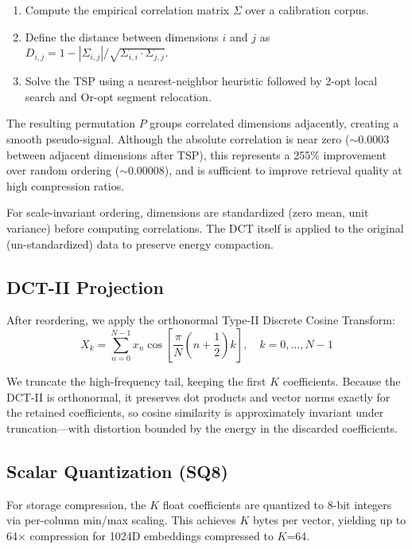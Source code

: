 \documentclass[sigconf]{acmart}
\begin{document}
\begin{enumerate}
    \item Compute the empirical correlation matrix $\Sigma$ over a calibration corpus.
    \item Define the distance between dimensions $i$ and $j$ as $D_{i,j} = 1 - |\Sigma_{i,j}| / \sqrt{\Sigma_{i,i} \cdot \Sigma_{j,j}}$.
    \item Solve the TSP using a nearest-neighbor heuristic followed by 2-opt local search and Or-opt segment relocation.
\end{enumerate}

The resulting permutation $P$ groups correlated dimensions adjacently, creating a smooth pseudo-signal. Although the absolute correlation is near zero ($\sim 0.0003$ between adjacent dimensions after TSP), this represents a 255\% improvement over random ordering ($\sim 0.00008$), and is sufficient to improve retrieval quality at high compression ratios.

For scale-invariant ordering, dimensions are standardized (zero mean, unit variance) before computing correlations. The DCT itself is applied to the original (un-standardized) data to preserve energy compaction.

\subsection{DCT-II Projection}\label{sec:dct}

After reordering, we apply the orthonormal Type-II Discrete Cosine Transform:
\begin{equation}
    X_k = \sum_{n=0}^{N-1} x_n \cos\left[\frac{\pi}{N}\left(n + \frac{1}{2}\right) k\right], \quad k = 0, \ldots, N-1
\end{equation}

We truncate the high-frequency tail, keeping the first $K$ coefficients. Because the DCT-II is orthonormal, it preserves dot products and vector norms exactly for the retained coefficients, so cosine similarity is approximately invariant under truncation---with distortion bounded by the energy in the discarded coefficients.

\subsection{Scalar Quantization (SQ8)}\label{sec:sq8}

For storage compression, the $K$ float coefficients are quantized to 8-bit integers via per-column min/max scaling. This achieves $K$ bytes per vector, yielding up to 64$\times$ compression for 1024D embeddings compressed to $K$=64.
\end{document}
